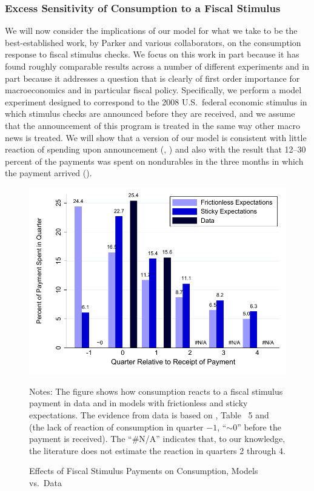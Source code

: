 \documentclass[titlepage]{./econtex}
\begin{document}
\hypertarget{Excess-Sensitivity-Experiment}{}
\subsubsection{Excess Sensitivity of Consumption to a Fiscal Stimulus}

We will now consider the implications of our model for what we take to be the best-established work, by Parker and various collaborators, on the consumption response to fiscal stimulus checks. We focus on this work in part because it has found roughly comparable results across a number of different experiments and in part because it addresses a question that is clearly of first order importance for macroeconomics and in particular fiscal policy. Specifically, we perform a model experiment designed to correspond to the 2008 U.S.\ federal economic stimulus in which stimulus checks are announced before they are received, and we assume that the announcement of this program is treated in the same way other macro news is treated. We will show that a version of our model is consistent with little reaction of spending upon announcement (\cite{brodaParker}, \cite{parker25million}) and also with the result that 12--30 percent of the payments was spent on nondurables in the three months in which the payment arrived (\cite{psjmMPC2008}).


\begin{figure}
  \centering
\caption{Effects of Fiscal Stimulus Payments on Consumption, Models vs.\ Data}
\label{parker}
{ \includegraphics[width=1.0\textwidth]{./Figures/parkerExperiment}}

\begin{flushleft}
  \footnotesize Notes: The figure shows how consumption reacts to a fiscal stimulus payment in data and in models with frictionless and sticky expectations. The evidence from data is based on \cite{psjmMPC2008}, Table ~5 and \cite{brodaParker} (the lack of reaction of consumption in quarter $-1$, ``$\sim0$'' before the payment is received). The ``\#N/A'' indicates that, to our knowledge, the literature does not estimate the reaction in quarters 2 through 4.
  \normalsize
  \end{flushleft}
\end{figure}
\end{document}
